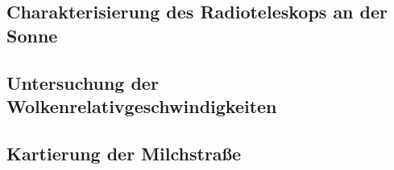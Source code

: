 \documentclass[../main.tex]{subfiles}
\begin{document}
    
    \subsection{Charakterisierung des Radioteleskops an der Sonne}\label{subsec:2:Sonne}
        


    \subsection{Untersuchung der Wolkenrelativgeschwindigkeiten}
        

    \subsection{Kartierung der Milchstraße}
        
        
\end{document}
